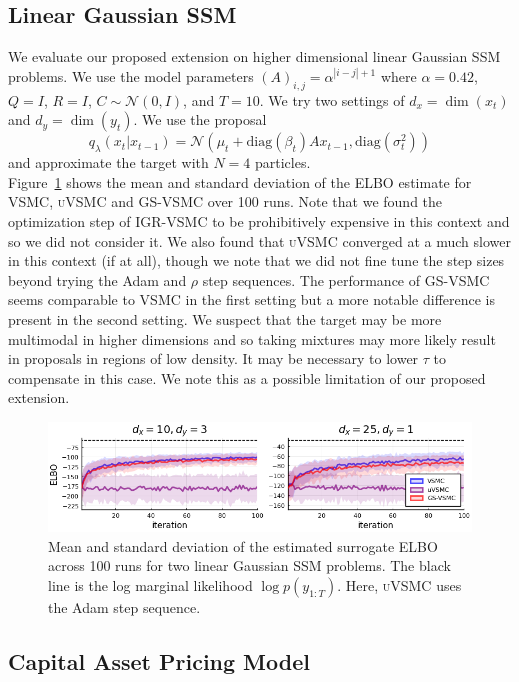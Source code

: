 \documentclass[12pt]{article}
\newcommand{\vsmc}{\textsc{VSMC}\xspace}
\newcommand{\uvsmc}{\textsc{uVSMC}\xspace}
\newcommand{\gsvsmc}{\textsc{GS-VSMC}\xspace}
\newcommand{\igrvsmc}{\textsc{IGR-VSMC}\xspace}
\newcommand{\elbo}{\textsc{ELBO}\xspace}
\newcommand{\ssm}{\textsc{SSM}\xspace}
\begin{document}
\subsection{Linear Gaussian \ssm}

We evaluate our proposed extension on higher dimensional linear Gaussian \ssm problems. We use the model parameters $(A)_{i,j}=\alpha^{|i-j|+1}$ where $\alpha=0.42$, $Q=I$, $R=I$, $C\sim\mathcal{N}(0,I)$, and $T=10$. We try two settings of $d_x=\dim(x_t)$ and $d_y=\dim(y_t)$. We use the proposal
\[
q_\lambda(x_t|x_{t-1}) = \mathcal{N}\left(\mu_t+\mathrm{diag}(\beta_t)Ax_{t-1},\mathrm{diag}(\sigma_t^2)\right)
\]
and approximate the target with $N=4$ particles.
\\

Figure~\ref{fig:lgss_elbo} shows the mean and standard deviation of the \elbo estimate for \vsmc, \uvsmc and \gsvsmc over 100 runs. Note that we found the optimization step of \igrvsmc to be prohibitively expensive in this context and so we did not consider it. We also found that \uvsmc converged at a much slower in this context (if at all), though we note that we did not fine tune the step sizes beyond trying the Adam and $\rho$ step sequences. The performance of \gsvsmc seems comparable to \vsmc in the first setting but a more notable difference is present in the second setting. We suspect that the target may be more multimodal in higher dimensions and so taking mixtures may more likely result in proposals in regions of low density. It may be necessary to lower $\tau$ to compensate in this case. We note this as a possible limitation of our proposed extension.

\begin{figure}[t]
\centering
\includegraphics[width=\textwidth]{figures/lgss_elbo.png}
\caption{Mean and standard deviation of the estimated surrogate \elbo across 100 runs for two linear Gaussian \ssm problems. The black line is the log marginal likelihood $\log p(y_{1:T})$. Here, \uvsmc uses the Adam step sequence.}
\label{fig:lgss_elbo}
\end{figure}

\subsection{Capital Asset Pricing Model}
\end{document}
